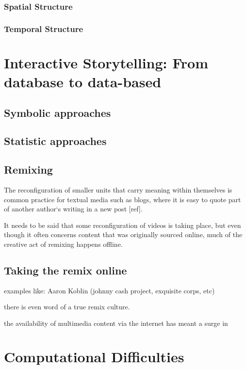 \subsubsection{Spatial Structure}
\subsubsection{Temporal Structure}




\section{Interactive Storytelling: From database to data-based}
\label{ch:storytelling}
\subsection{Symbolic approaches}
\label{sec:symbolic}

\cite{Vilmos:2011wv,RodrigoLaiolaGuimaraes:2011tl,Ursu:2009gc}

\subsection{Statistic approaches}
\label{sec:statistic}

\subsection{Remixing}

The reconfiguration of smaller units that carry meaning within themselves is common practice for textual media such as blogs, where it is easy to quote part of  another author`s writing in a new post [ref]. 

It needs to be said that some reconfiguration of videos is taking place, but even though it often concerns content that was originally sourced online, much of the creative act of remixing happens offline.


\subsection{Taking the remix online}

examples like: Aaron Koblin (johnny cash project, exquisite corps, etc)

there is even word of a true remix culture\cite{Diakopoulos:2007tl}.

the availability of multimedia content via the internet has meant a surge in 


\section{Computational Difficulties}







